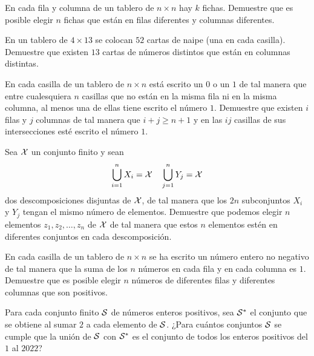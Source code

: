 \begin{probEG}
	En cada fila y columna de un tablero de $n\times n$ hay $k$ fichas. Demuestre que es posible elegir $n$ fichas que están en filas diferentes y columnas diferentes.
\end{probEG}

\begin{probEG}
	En un tablero de $4\times 13$ se colocan $52$ cartas de naipe (una en cada casilla). Demuestre que existen $13$ cartas de números distintos que están en columnas distintas.
\end{probEG}

\begin{probEB}
	En cada casilla de un tablero de $n\times n$ está escrito un $0$ o un $1$ de tal manera que entre cualesquiera $n$ casillas que no están en la misma fila ni en la misma columna, al menos una de ellas tiene escrito el número $1$. Demuestre que existen $i$ filas y $j$ columnas de tal manera que $i+j\ge n+1$ y en las $ij$ casillas de sus intersecciones esté escrito el número $1$.
\end{probEB}

\begin{probEG}
	Sea $\cal X$ un conjunto finito y sean
	\[\bigcup_{i=1}^n X_i={\cal X}\quad\bigcup_{j=1}^n Y_j={\cal X}\]
	dos descomposiciones disjuntas de $\cal X$, de tal manera que los $2n$ subconjuntos $X_i$ y $Y_j$ tengan el mismo número de elementos. Demuestre que podemos elegir $n$ elementos $z_1,z_2,\dots,z_n$ de $\cal X$ de tal manera que estos $n$ elementos estén en diferentes conjuntos en cada descomposición.
\end{probEG}

\begin{probEG}
	En cada casilla de un tablero de $n\times n$ se ha escrito un número entero no negativo de tal manera que la suma de los $n$ números en cada fila y en cada columna es $1$. Demuestre que es posible elegir $n$ números de diferentes filas y diferentes columnas que son positivos.
\end{probEG}

\begin{probEB}
	Para cada conjunto finito $\cal S$ de números enteros positivos, sea $\cal S^\ast$ el conjunto que se obtiene al sumar $2$ a cada elemento de $\cal S$. ¿Para cuántos conjuntos $\cal S$ se cumple que la unión de $\cal S$ con $\cal S^\ast$ es el conjunto de todos los enteros positivos del $1$ al $2022$?
\end{probEB}

